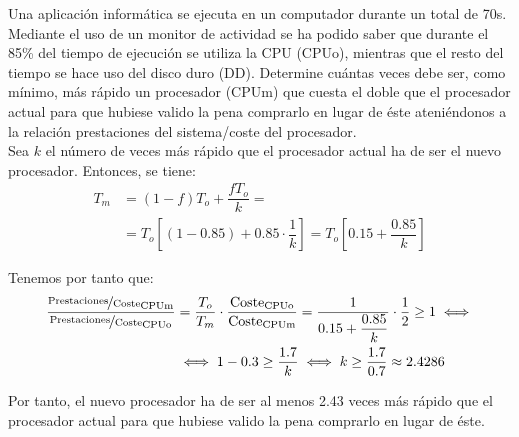 \begin{comment}
SOLUCIÓN:
\begin{enumerate}
    \item La nueva unidad de disco de 4 veces más rápida que la vieja.
    \item El tiempo de ejecución, en el mejor de los casos, podría reducirse hasta los 31,5 segundos.
    \item La nueva curva tendría una forma similar a la dibujada; partiría del mismo origen pero llegaría, en el extremo derecho, hasta una ganancia en velocidad global de valor 2.
\end{enumerate}
\end{comment}   

\begin{ejercicio}
Una aplicación informática se ejecuta en un computador durante un total de 70s. Mediante el uso de un monitor de actividad se ha podido saber que durante el 85\% del tiempo de ejecución se utiliza la CPU (CPUo), mientras que el resto del tiempo se hace uso del disco duro (DD). Determine cuántas veces debe ser, como mínimo, más rápido un procesador (CPUm) que cuesta el doble que el procesador actual para que hubiese valido la pena comprarlo en lugar de éste ateniéndonos a la relación prestaciones del sistema/coste del procesador.\\

Sea $k$ el número de veces más rápido que el procesador actual ha de ser el nuevo procesador. Entonces, se tiene:
\begin{align*}
    T_m &= (1-f)T_o + \dfrac{fT_o}{k}
    =\\&= T_o\left[(1-0.85) + 0.85\cdot \dfrac{1}{k}\right]
    = T_o\left[0.15 + \dfrac{0.85}{k}\right]
\end{align*}

Tenemos por tanto que:
\begin{align*}
    \dfrac{\nicefrac{\text{Prestaciones}}{\text{Coste}}_{\text{CPUm}}}{\nicefrac{\text{Prestaciones}}{\text{Coste}}_{\text{CPUo}}} &= \dfrac{T_o}{T_m}\cdot \dfrac{\text{Coste}_{\text{CPUo}}}{\text{Coste}_{\text{CPUm}}}
    = \dfrac{1}{0.15 + \dfrac{0.85}{k}}\cdot \dfrac{1}{2}  \geq 1\iff 
    \\ &\iff 1-0.3\geq \dfrac{1.7}{k}\iff k\geq \dfrac{1.7}{0.7} \approx 2.4286
\end{align*}

Por tanto, el nuevo procesador ha de ser al menos 2.43 veces más rápido que el procesador actual para que hubiese valido la pena comprarlo en lugar de éste.
\end{ejercicio}
\begin{comment}
SOLUCIÓN: Al menos 2,43 veces más rápido.
\end{comment}

